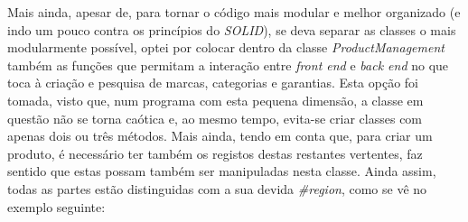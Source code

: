 \documentclass[11pt]{scrartcl} %
\begin{document}
\vspace{20px}
Mais ainda, apesar de, para tornar o código mais modular e melhor organizado (e indo um pouco contra os princípios do \textit{SOLID}), se deva separar as classes o mais modularmente possível, optei por colocar dentro da classe \textit{ProductManagement} também as funções que permitam a interação entre \textit{front end} e \textit{back end} no que toca à criação e pesquisa de marcas, categorias e garantias. Esta opção foi tomada, visto que, num programa com esta pequena dimensão, a classe em questão não se torna caótica e, ao mesmo tempo, evita-se criar classes com apenas dois ou três métodos. Mais ainda, tendo em conta que, para criar um produto, é necessário ter também os registos destas restantes vertentes, faz sentido que estas possam também ser manipuladas nesta classe. Ainda assim, todas as partes estão distinguidas com a sua devida \textit{\#region}, como se vê no exemplo seguinte:
\end{document}
